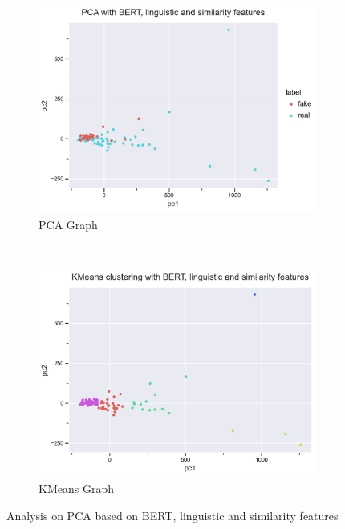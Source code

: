 \documentclass{article}
\begin{document}
\begin{figure}[t!]
  \centering
  \begin{subfigure}[t]{0.5\textwidth}
    \centering
    \includegraphics[scale=0.5]{img/pca_3.png}
    \caption{PCA Graph}
    \label{pca_2}
  \end{subfigure}%
  ~
  \begin{subfigure}[t]{0.5\textwidth}
    \centering
    \includegraphics[scale=0.5]{img/kmeans_3.png}
    \caption{KMeans Graph}
    \label{kmeans_2}
  \end{subfigure}
  \caption{Analysis on PCA based on BERT, linguistic and similarity features}
  \label{pca_kmeans_2}
\end{figure}
\end{document}
